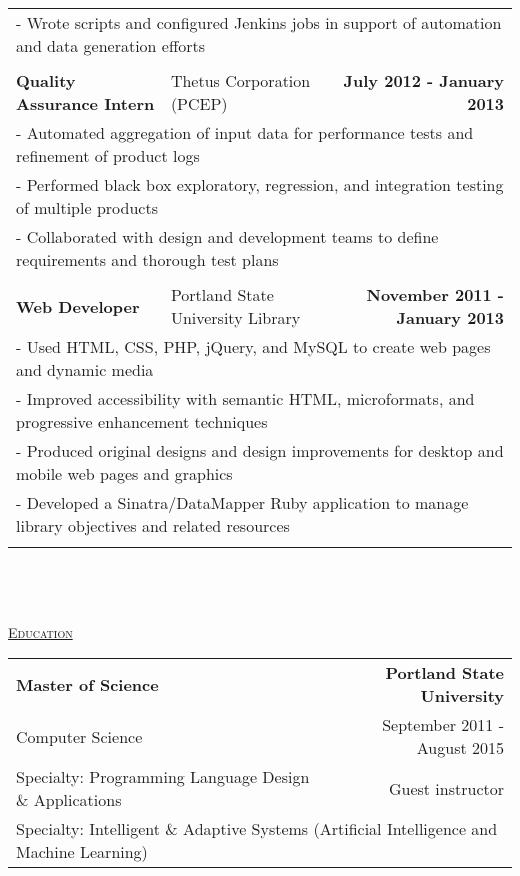 \documentclass[letterpaper]{article}
\begin{document}
\begin{center}
\begin{tabular}{p{}p{}r}
			\\
				\multicolumn{3}{p{\textwidth}}{\quad\quad - Wrote scripts and configured Jenkins jobs in support of automation and data generation efforts} 
			\\
			\\
				\textbf{Quality Assurance Intern}					&
				Thetus Corporation (PCEP)							&
				\textbf{July 2012 - January 2013}
			\\
				\multicolumn{3}{p{\textwidth}}{\quad\quad - Automated aggregation of input data for performance tests and refinement of product logs}
			\\
				\multicolumn{3}{p{\textwidth}}{\quad\quad - Performed black box exploratory, regression, and integration testing of multiple products} 
			\\
				\multicolumn{3}{p{\textwidth}}{\quad\quad - Collaborated with design and development teams to define requirements and thorough test plans}
			\\
			\\
				\textbf{Web Developer}						&
				Portland State University Library					&
				\textbf{November 2011 - January 2013}
			\\
				\multicolumn{3}{p{\textwidth}}{\quad\quad - Used HTML, CSS, PHP, jQuery, and MySQL to create web pages and dynamic media} 
			\\
				\multicolumn{3}{p{\textwidth}}{\quad\quad - Improved accessibility with semantic HTML, microformats, and progressive enhancement techniques} 
			\\
				\multicolumn{3}{p{\textwidth}}{\quad\quad - Produced original designs and design improvements for desktop and mobile web pages and graphics} 
			\\
				\multicolumn{3}{p{\textwidth}}{\quad\quad - Developed a Sinatra/DataMapper Ruby application to manage library objectives and related resources} 
			\\
			\\
		\end{tabular}
        \\
        \\
        \\
		\underline{\large \scshape Education} \\
		\begin{tabular}{p{}r}
				\textbf{Master of Science}							&
				\textbf{Portland State University}
			\\
				Computer Science\qua				&
				September 2011 - August 2015
			\\
				Specialty: Programming Language Design \& Applications		&		Guest instructor
			\\	
				\multicolumn{2}{p{\textwidth}}{Specialty: Intelligent \& Adaptive Systems (Artificial Intelligence and Machine Learning)}
				

\end{tabular}
\end{center}
\end{document}
